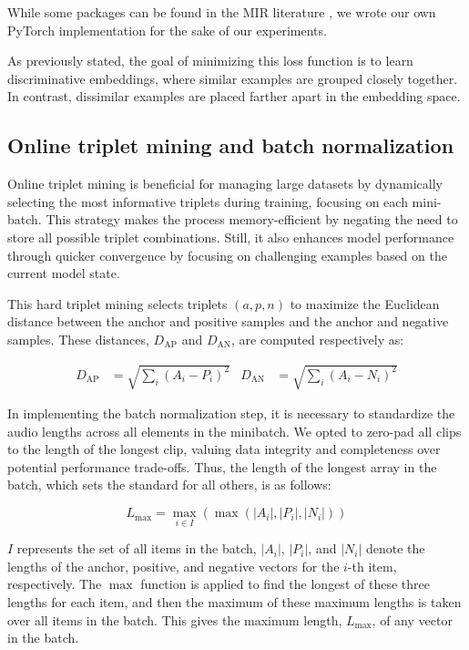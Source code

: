 While some packages can be found in the MIR literature \cite{auraloss}, we wrote our own PyTorch \cite{Paszke2019PyTorch:Library} implementation for the sake of our experiments.

As previously stated, the goal of minimizing this loss function is to learn discriminative embeddings, where similar examples are grouped closely together. In contrast, dissimilar examples are placed farther apart in the embedding space.

\subsection{Online triplet mining and batch normalization}

Online triplet mining is beneficial for managing large datasets by dynamically selecting the most informative triplets during training, focusing on each mini-batch. This strategy makes the process memory-efficient by negating the need to store all possible triplet combinations. Still, it also enhances model performance through quicker convergence by focusing on challenging examples based on the current model state.

This hard triplet mining selects triplets $(a, p, n)$ to maximize the Euclidean distance between the anchor and positive samples and the anchor and negative samples. These distances, $D_{\text{AP}}$ and $D_{\text{AN}}$, are computed respectively as:


\begin{align}
D_{\text{AP}} &= \sqrt{\sum_{i} (A_i - P_i)^2} & D_{\text{AN}} &= \sqrt{\sum_{i} (A_i - N_i)^2}
\end{align}


In implementing the batch normalization step, it is necessary to standardize the audio lengths across all elements in the minibatch. We opted to zero-pad all clips to the length of the longest clip, valuing data integrity and completeness over potential performance trade-offs. Thus, the length of the longest array in the batch, which sets the standard for all others, is as follows:

\begin{equation}
L_{\text{max}} = \max_{i \in I} \left( \max \left( |A_i|, |P_i|, |N_i| \right) \right)
\end{equation}

$I$ represents the set of all items in the batch, $|A_i|$, $|P_i|$, and $|N_i|$ denote the lengths of the anchor, positive, and negative vectors for the $i$-th item, respectively. The $\max$ function is applied to find the longest of these three lengths for each item, and then the maximum of these maximum lengths is taken over all items in the batch. This gives the maximum length, $L_{\text{max}}$, of any vector in the batch.

